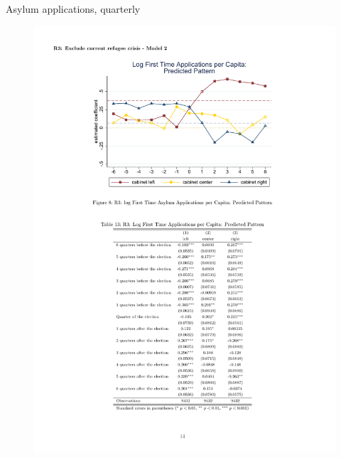 \documentclass{beamer}
\begin{document}
\begin{frame}{Asylum applications, quarterly}
\begin{figure}[tb]
\begin{center}
  \includegraphics[width=12cm]{graph2.pdf}
 \end{center}
\end{figure}
\end{frame}
\end{document}
